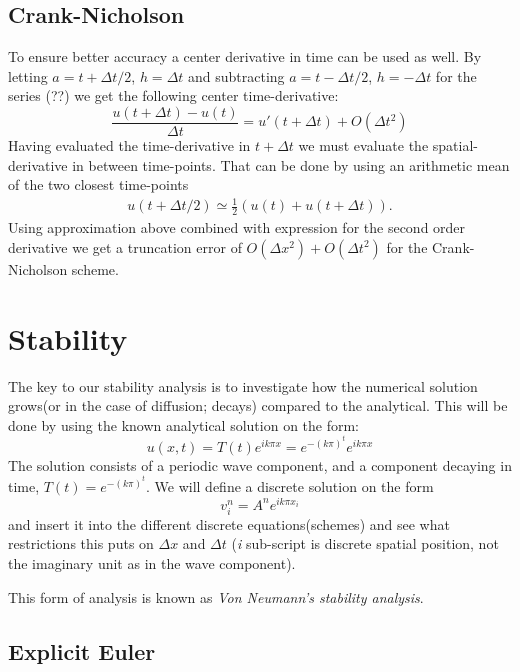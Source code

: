 \documentclass[11pt,a4paper,draft]{article}
\numberwithin{equation}{section}
\begin{document}
\subsection{Crank-Nicholson}
To ensure better accuracy a center derivative in time can be used as well. By letting $a=t+\Delta t/2$, $h=\Delta t$ and subtracting $a=t-\Delta t/2$, $h=-\Delta t$ for the series (??) we get the following center time-derivative:
\begin{equation}
\frac{u(t + \Delta t)-u(t)}{\Delta t} = u'(t+\Delta t) + O(\Delta t^2)
\end{equation}
Having evaluated the time-derivative in $t+\Delta t$ we must evaluate the spatial-derivative in between time-points. That can be done by using an arithmetic mean of the two closest time-points
\begin{align*}
u(t+\Delta t/2) \simeq \frac{1}{2}(u(t)+u(t+\Delta t)).
\end{align*}
Using approximation above combined with expression for the second order derivative we get a truncation error of $O(\Delta x^2)+O(\Delta t^2)$ for the Crank-Nicholson scheme. 


\section{Stability}

The key to our stability analysis is to investigate how the numerical solution grows(or in the case of diffusion; decays) compared to the analytical. This will be done by using the known analytical solution on the form:
\begin{equation}
u(x,t) = T(t)e^{ik \pi x} = e^{-(k\pi)^t}e^{ik \pi x}
\end{equation}
The solution consists of a periodic wave component, and a component decaying in time, $T(t)=e^{-(k\pi)^t}$. We will define a discrete solution on the form
\begin{equation}
v^n_i = A^n e^{ik \pi x_i}
\end{equation}
and insert it into the different discrete equations(schemes) and see what restrictions this puts on $\Delta x$ and $\Delta t$ (\emph{i} sub-script is discrete spatial position, not the imaginary unit as in the wave component).

This form of analysis is known as \emph{Von Neumann's stability analysis}.

\subsection{Explicit Euler}
\end{document}
